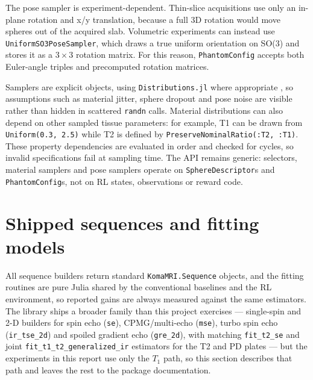 The pose sampler is experiment-dependent. Thin-slice acquisitions use
only an in-plane rotation and x/y translation, because a full 3D rotation
would move spheres out of the acquired slab. Volumetric experiments can
instead use \texttt{UniformSO3PoseSampler}, which draws a true uniform
orientation on SO(3) and stores it as a \(3\times3\) rotation matrix. For
this reason, \texttt{PhantomConfig} accepts both Euler-angle triples and
precomputed rotation matrices.

Samplers are explicit objects, using
\texttt{Distributions.\allowbreak jl} where appropriate
\cite{distributions_jl_2021}, so assumptions such as material jitter,
sphere dropout and pose noise are visible rather than hidden in scattered
\texttt{randn} calls. Material distributions can also depend on other
sampled tissue parameters: for example, T1 can be drawn from
\texttt{Uniform(0.3,\ 2.5)} while T2 is defined by
\texttt{PreserveNominalRatio(:T2,\ :T1)}. These property dependencies are
evaluated in order and checked for cycles, so invalid specifications fail
at sampling time. The API remains generic: selectors, material samplers
and pose samplers operate on \texttt{SphereDescriptor}s and
\texttt{PhantomConfig}s, not on RL states, observations or reward code.

\hypertarget{shipped-sequences-and-fitting-models}{%
\section{Shipped sequences and fitting models}\label{shipped-sequences-and-fitting-models}}

All sequence builders return standard \texttt{KomaMRI.\allowbreak Sequence}
objects, and the fitting routines are pure Julia shared by the conventional
baselines and the RL environment, so reported gains are always measured
against the same estimators. The library ships a broader family than this
project exercises --- single-spin and 2-D builders for spin echo
(\texttt{se}), CPMG/multi-echo (\texttt{mse}), turbo spin echo
(\texttt{ir\_tse\_2d}) and spoiled gradient echo (\texttt{gre\_2d}), with
matching \texttt{fit\_t2\_se} and joint \texttt{fit\_t1\_t2\_generalized\_ir}
estimators for the T2 and PD plates --- but the experiments in this report
use only the $T_1$ path, so this section describes that path and leaves the
rest to the package documentation.


